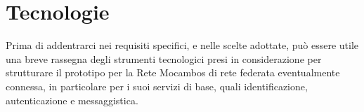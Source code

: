 




\section{Tecnologie}
Prima di addentrarci nei requisiti specifici, e nelle scelte adottate,
può essere utile una breve rassegna degli strumenti tecnologici presi
in considerazione per strutturare il prototipo per la Rete Mocambos di
rete federata eventualmente connessa, in particolare per i suoi
servizi di base, quali identificazione, autenticazione e
messaggistica.


